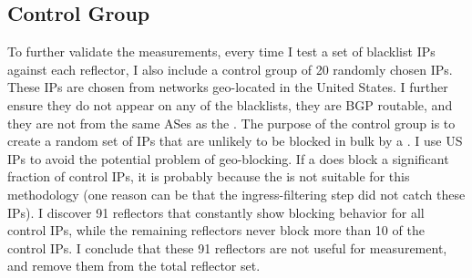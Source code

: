 
\subsection{Control Group}
\label{sec:methvalid}
To further validate the measurements, every time I test a set of
blacklist IPs against each reflector, I also include a control group
of 20 randomly chosen IPs. These IPs are chosen from networks
geo-located in the United States. I further ensure they do not
appear on any of the blacklists, they are BGP routable, and they are
not from the same ASes as the {}. The purpose of the
control group is to create a random set of IPs that are unlikely to be
blocked in bulk by a {}. I use US IPs to avoid the
potential problem of geo-blocking. If a {} does block a
significant fraction of control IPs, it is probably because the
{} is not suitable for this methodology (one reason can be
that the ingress-filtering step did not catch these IPs). I discover
91 reflectors that constantly show blocking behavior for all control
IPs, while the remaining reflectors never block more than 10 of the
control IPs. I conclude that these 91 reflectors are not useful for
measurement, and remove them from the total reflector set.

